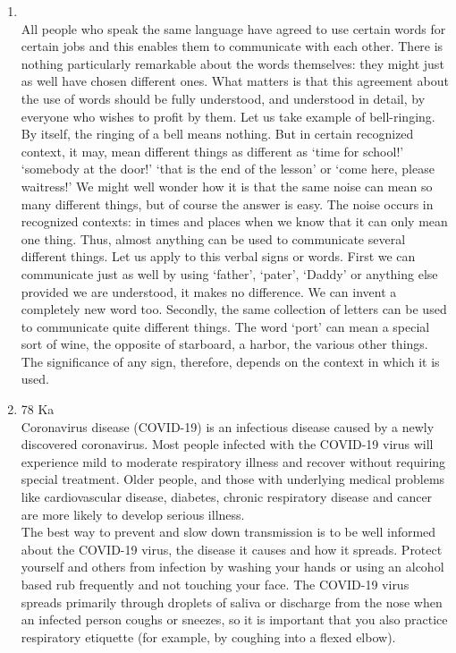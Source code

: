 \documentclass[12pt]{article}
\begin{document}
\begin{enumerate}
    \item {}\\
      All people who speak the same language have agreed to use certain words for certain jobs and this enables them to communicate with each other. There is nothing particularly remarkable about the words themselves: they might just as well have chosen different ones. What matters is that this agreement about the use of words should be fully understood, and understood in detail, by everyone who wishes to profit by them. Let us take example of bell-ringing. By itself, the ringing of a bell means nothing. But in certain recognized context, it may, mean different things as different as ‘time for school!’ ‘somebody at the door!’ ‘that is the end of the lesson’ or ‘come here, please waitress!’ We might well wonder how it is that the same noise can mean so many different things, but of course the answer is easy. The noise occurs in recognized contexts: in times and places when we know that it can only mean one thing. Thus, almost anything can be used to communicate several different things. Let us apply to this verbal signs or words. First we can communicate just as well by using ‘father’, ‘pater’, ‘Daddy’ or anything else provided we are understood, it makes no difference. We can invent a completely new word too. Secondly, the same collection of letters can be used to communicate quite different things. The word ‘port’ can mean a special sort of wine, the opposite of starboard, a harbor, the various other things. The significance of any sign, therefore, depends on the context in which it is used.

    \item 78 Ka\\
      Coronavirus disease (COVID-19) is an infectious disease caused by a newly discovered coronavirus. Most people infected with the COVID-19 virus will experience mild to moderate respiratory illness and recover without requiring special treatment. Older people, and those with underlying medical problems like cardiovascular disease, diabetes, chronic respiratory disease and cancer are more likely to develop serious illness.\\

      The best way to prevent and slow down transmission is to be well informed about the COVID-19 virus, the disease it causes and how it spreads. Protect yourself and others from infection by washing your hands or using an alcohol based rub frequently and not touching your face. The COVID-19 virus spreads primarily through droplets of saliva or discharge from the nose when an infected person coughs or sneezes, so it is important that you also practice respiratory etiquette (for example, by coughing into a flexed elbow).\\
      

\end{enumerate}
\end{document}
